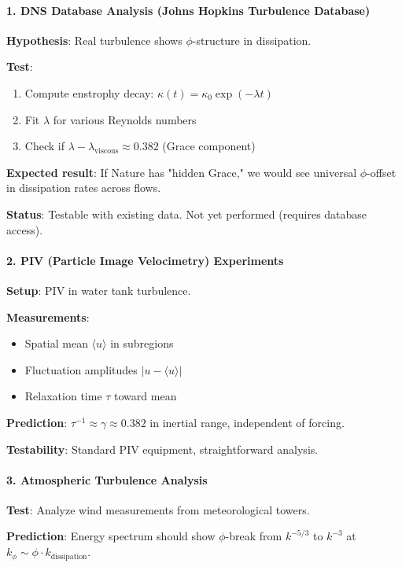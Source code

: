 \documentclass[12pt,a4paper]{article}
\begin{document}
\paragraph{1. DNS Database Analysis (Johns Hopkins Turbulence Database)}

\textbf{Hypothesis}: Real turbulence shows $\phi$-structure in dissipation.

\textbf{Test}:
\begin{enumerate}
\item Compute enstrophy decay: $\kappa(t) = \kappa_0 \exp(-\lambda t)$
\item Fit $\lambda$ for various Reynolds numbers
\item Check if $\lambda - \lambda_{\text{viscous}} \approx 0.382$ (Grace component)
\end{enumerate}

\textbf{Expected result}: If Nature has "hidden Grace," we would see universal $\phi$-offset in dissipation rates across flows.

\textbf{Status}: Testable with existing data. Not yet performed (requires database access).

\paragraph{2. PIV (Particle Image Velocimetry) Experiments}

\textbf{Setup}: PIV in water tank turbulence.

\textbf{Measurements}:
\begin{itemize}
\item Spatial mean $\langle u \rangle$ in subregions
\item Fluctuation amplitudes $|u - \langle u \rangle|$
\item Relaxation time $\tau$ toward mean
\end{itemize}

\textbf{Prediction}: $\tau^{-1} \approx \gamma \approx 0.382$ in inertial range, independent of forcing.

\textbf{Testability}: Standard PIV equipment, straightforward analysis.

\paragraph{3. Atmospheric Turbulence Analysis}

\textbf{Test}: Analyze wind measurements from meteorological towers.

\textbf{Prediction}: Energy spectrum should show $\phi$-break from $k^{-5/3}$ to $k^{-3}$ at $k_\phi \sim \phi \cdot k_{\text{dissipation}}$.
\end{document}
